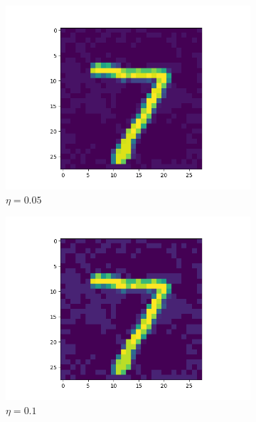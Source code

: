 \begin{figure}
  \centering
  \begin{subfigure}{0.3\linewidth}
    \includegraphics[width=\linewidth]{adversarial-input-fc-100-100-10-005.png}
    \caption{$\eta = 0.05$}
  \end{subfigure}
  \begin{subfigure}{0.3\linewidth}
    \includegraphics[width=\linewidth]{adversarial-input-fc-100-100-10-01.png}
    \caption{$\eta = 0.1$}
  \end{subfigure}
  \begin{subfigure}{0.3\linewidth}

\end{subfigure}
\end{figure}
